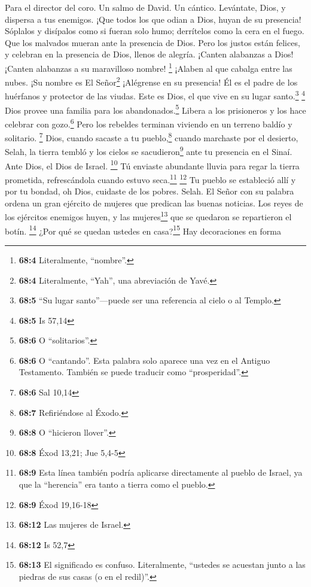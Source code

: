 Para el director del coro. Un salmo de David. Un cántico. 
Levántate, Dios, y dispersa a tus enemigos. ¡Que todos los que odian a
Dios, huyan de su presencia!  Sóplalos y disípalos como si
fueran solo humo; derrítelos como la cera en el fuego. Que los malvados
mueran ante la presencia de Dios.  Pero los justos están
felices, y celebran en la presencia de Dios, llenos de alegría.
 ¡Canten alabanzas a Dios! ¡Canten alabanzas a su
maravilloso nombre! \footnote{\textbf{68:4} Literalmente, ``nombre''.}
¡Alaben al que cabalga entre las nubes. ¡Su nombre es El
Señor\footnote{\textbf{68:4} Literalmente, ``Yah'', una abreviación de
  Yavé.} ¡Alégrense en su presencia!  Él es el padre de
los huérfanos y protector de las viudas. Este es Dios, el que vive en su
lugar santo.\footnote{\textbf{68:5} ``Su lugar santo''---puede ser una
  referencia al cielo o al Templo.} \footnote{\textbf{68:5} Is 57,14}
 Dios provee una familia para los abandonados.\footnote{\textbf{68:6}
  O ``solitarios''.} Libera a los prisioneros y los hace celebrar con
gozo.\footnote{\textbf{68:6} O ``cantando''. Esta palabra solo aparece
  una vez en el Antiguo Testamento. También se puede traducir como
  ``prosperidad''.} Pero los rebeldes terminan viviendo en un terreno
baldío y solitario. \footnote{\textbf{68:6} Sal 10,14} 
Dios, cuando sacaste a tu pueblo,\footnote{\textbf{68:7} Refiriéndose al
  Éxodo.} cuando marchaste por el desierto, Selah,  la
tierra tembló y los cielos se sacudieron\footnote{\textbf{68:8} O
  ``hicieron llover''.} ante tu presencia en el Sinaí. Ante Dios, el
Dios de Israel. \footnote{\textbf{68:8} Éxod 13,21; Jue 5,4-5}
 Tú enviaste abundante lluvia para regar la tierra
prometida, refrescándola cuando estuvo seca.\footnote{\textbf{68:9} Esta
  línea también podría aplicarse directamente al pueblo de Israel, ya
  que la ``herencia'' era tanto a tierra como el pueblo.} \footnote{\textbf{68:9}
  Éxod 19,16-18}  Tu pueblo se estableció allí y por tu
bondad, oh Dios, cuidaste de los pobres. Selah.  El Señor
con su palabra ordena un gran ejército de mujeres que predican las
buenas noticias.  Los reyes de los ejércitos enemigos
huyen, y las mujeres\footnote{\textbf{68:12} Las mujeres de Israel.} que
se quedaron se repartieron el botín. \footnote{\textbf{68:12} Is 52,7}
 ¿Por qué se quedan ustedes en casa?\footnote{\textbf{68:13}
  El significado es confuso. Literalmente, ``ustedes se acuestan junto a
  las piedras de sus casas (o en el redil)''.} Hay decoraciones en forma
